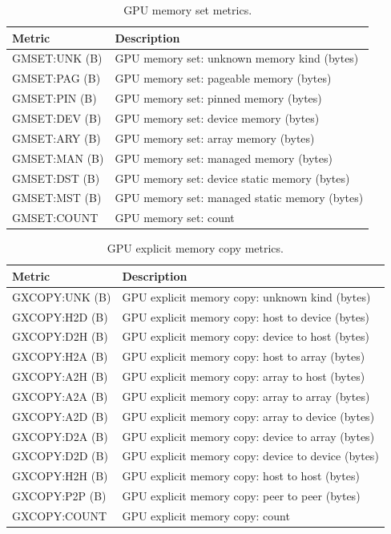 \begin{table}[t]
\centering
\begin{tabular}{|l|l|}\hline
Metric & Description\\\hline\hline
 GMSET:UNK (B)  &  GPU memory set: unknown memory kind (bytes)  \\\hline
  GMSET:PAG (B)  &  GPU memory set: pageable memory (bytes)  \\\hline
  GMSET:PIN (B)  &  GPU memory set: pinned memory (bytes)  \\\hline
  GMSET:DEV (B)  &  GPU memory set: device memory (bytes)  \\\hline
  GMSET:ARY (B)  &  GPU memory set: array memory (bytes)  \\\hline
  GMSET:MAN (B)  &  GPU memory set: managed memory (bytes)  \\\hline
  GMSET:DST (B)  &  GPU memory set: device static memory (bytes)  \\\hline
  GMSET:MST (B)  &  GPU memory set: managed static memory (bytes)  \\\hline
  GMSET:COUNT  &  GPU memory set: count  \\\hline
\end{tabular}
\caption{GPU memory set metrics.}
\label{table:gmset}
\end{table}

\begin{table}[t]
\centering
\begin{tabular}{|l|l|}\hline
Metric & Description\\\hline\hline
 GXCOPY:UNK (B)  &  GPU explicit memory copy: unknown kind (bytes)  \\\hline 
  GXCOPY:H2D (B)  &  GPU explicit memory copy: host to device (bytes)  \\\hline 
  GXCOPY:D2H (B)  &  GPU explicit memory copy: device to host (bytes)  \\\hline 
  GXCOPY:H2A (B)  &  GPU explicit memory copy: host to array (bytes)  \\\hline 
  GXCOPY:A2H (B)  &  GPU explicit memory copy: array to host (bytes)  \\\hline 
  GXCOPY:A2A (B)  &  GPU explicit memory copy: array to array (bytes)  \\\hline 
  GXCOPY:A2D (B)  &  GPU explicit memory copy: array to device (bytes)  \\\hline 
  GXCOPY:D2A (B)  &  GPU explicit memory copy: device to array (bytes)  \\\hline 
  GXCOPY:D2D (B)  &  GPU explicit memory copy: device to device (bytes)  \\\hline 
  GXCOPY:H2H (B)  &  GPU explicit memory copy: host to host (bytes)  \\\hline 
  GXCOPY:P2P (B)  &  GPU explicit memory copy: peer to peer (bytes)  \\\hline 
  GXCOPY:COUNT  &  GPU explicit memory copy: count  \\\hline 
\end{tabular}
\caption{GPU explicit memory copy metrics.}
\label{table:gxcopy}
\end{table}


